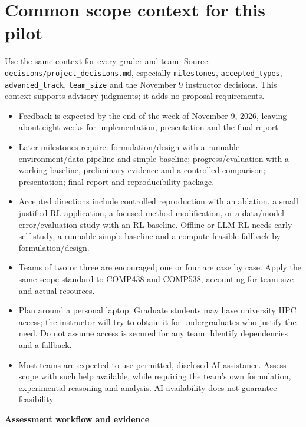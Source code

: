 \documentclass{article}
\begin{document}
\section*{Common scope context for this pilot}
Use the same context for every grader and team. Source: \nolinkurl{decisions/project_decisions.md}, especially \texttt{milestones}, \texttt{accepted\_types}, \texttt{advanced\_track}, \texttt{team\_size} and the November 9 instructor decisions. This context supports advisory judgments; it adds no proposal requirements.
\begin{itemize}
\item Feedback is expected by the end of the week of November 9, 2026, leaving about eight weeks for implementation, presentation and the final report.
\item Later milestones require: formulation/design with a runnable environment/data pipeline and simple baseline; progress/evaluation with a working baseline, preliminary evidence and a controlled comparison; presentation; final report and reproducibility package.
\item Accepted directions include controlled reproduction with an ablation, a small justified RL application, a focused method modification, or a data/model-error/evaluation study with an RL baseline. Offline or LLM RL needs early self-study, a runnable simple baseline and a compute-feasible fallback by formulation/design.
\item Teams of two or three are encouraged; one or four are case by case. Apply the same scope standard to COMP438 and COMP538, accounting for team size and actual resources.
\item Plan around a personal laptop. Graduate students may have university HPC access; the instructor will try to obtain it for undergraduates who justify the need. Do not assume access is secured for any team. Identify dependencies and a fallback.
\item Most teams are expected to use permitted, disclosed AI assistance. Assess scope with such help available, while requiring the team's own formulation, experimental reasoning and analysis. AI availability does not guarantee feasibility.
\end{itemize}

\newpage
\begin{center}{\large\bfseries Assessment workflow and evidence}\end{center}
\end{document}
